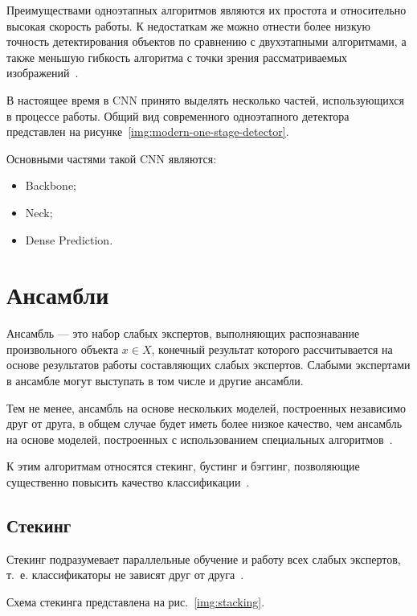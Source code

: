 Преимуществами одноэтапных алгоритмов являются их простота и относительно высокая скорость работы. К недостаткам же можно отнести более низкую точность детектирования объектов по сравнению с двухэтапными алгоритмами, а также меньшую гибкость алгоритма с точки зрения рассматриваемых изображений~\cite{review-on-one-stage-object-detection}.

В настоящее время в CNN принято выделять несколько частей, использующихся в процессе работы. Общий вид современного одноэтапного детектора представлен на рисунке~\ref{img:modern-one-stage-detector}.


Основными частями такой CNN являются:
\begin{itemize}[label=---]
    \item Backbone;
    \item Neck;
    \item Dense Prediction.
\end{itemize}

\section{Ансамбли}

Ансамбль --- это набор слабых экспертов, выполняющих распознавание произвольного объекта $x \in X$, конечный результат которого рассчитывается на основе результатов работы составляющих слабых экспертов. Слабыми экспертами в ансамбле могут выступать в том числе и другие ансамбли.

Тем не менее, ансамбль на основе нескольких моделей, построенных независимо друг от друга, в общем случае будет иметь более низкое качество, чем ансамбль на основе моделей, построенных с использованием специальных алгоритмов~\cite{ensembles}.

К этим алгоритмам относятся стекинг, бустинг и бэггинг, позволяющие существенно повысить качество классификации~\cite{ensembles}.

\subsection{Стекинг}

Стекинг подразумевает параллельные обучение и работу всех слабых экспертов, т.~е. классификаторы не зависят друг от друга~\cite{ensembles}. 

Схема стекинга представлена на рис.~\ref{img:stacking}.

